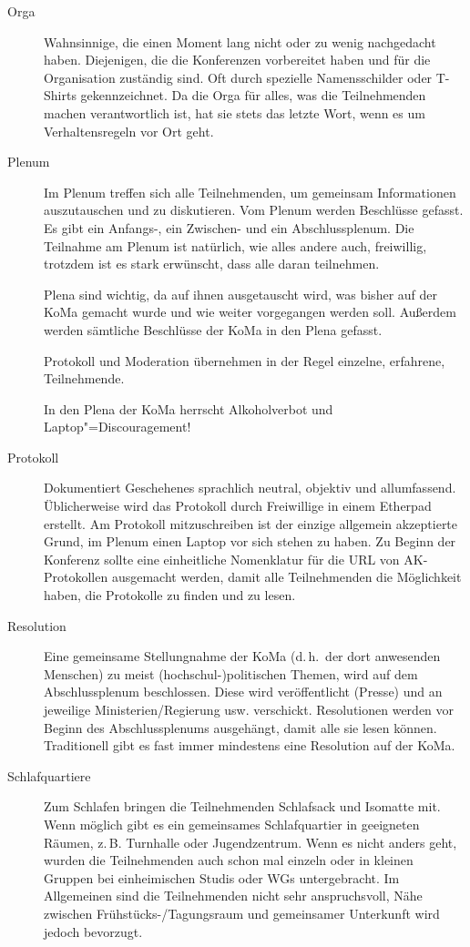 \begin{description}
\item[Orga]
    Wahnsinnige, die einen Moment lang nicht oder zu wenig nachgedacht haben. Diejenigen, die die Konferenzen vorbereitet haben und für die Organisation zuständig sind. Oft durch spezielle Namensschilder oder T-Shirts gekennzeichnet.
    Da die Orga für alles, was die Teilnehmenden machen verantwortlich ist, hat sie stets das letzte Wort, wenn es um Verhaltensregeln vor Ort geht.

\item[Plenum]
    Im Plenum treffen sich alle Teilnehmenden, um gemeinsam Informationen auszutauschen und zu diskutieren. Vom Plenum werden Beschlüsse gefasst. Es gibt ein Anfangs-, ein Zwischen- und ein Abschlussplenum. Die Teilnahme am Plenum ist natürlich, wie alles andere auch, freiwillig, trotzdem ist es stark erwünscht, dass alle daran teilnehmen.
    
    Plena sind wichtig, da auf ihnen ausgetauscht wird, was bisher auf der KoMa gemacht wurde und wie weiter vorgegangen werden soll. Außerdem werden sämtliche Beschlüsse der KoMa in den Plena gefasst.
    
	Protokoll und Moderation übernehmen in der Regel einzelne, erfahrene, Teilnehmende.
    
    In den Plena der KoMa herrscht Alkoholverbot und Laptop"=Discouragement!

\item[Protokoll]
    Dokumentiert Geschehenes sprachlich neutral, objektiv und allumfassend. Üblicherweise wird das Protokoll durch Freiwillige in einem Etherpad erstellt. Am Protokoll mitzuschreiben ist der einzige allgemein akzeptierte Grund, im Plenum einen Laptop vor sich stehen zu haben.
	Zu Beginn der Konferenz sollte eine einheitliche Nomenklatur für die URL von AK-Protokollen ausgemacht werden, damit alle Teilnehmenden die Möglichkeit haben, die Protokolle zu finden und zu lesen.

\item[Resolution]
    Eine gemeinsame Stellungnahme der KoMa (d.\,h.\ der dort anwesenden Menschen) zu meist (hochschul-)politischen Themen, wird auf dem Abschlussplenum beschlossen.
    Diese wird veröffentlicht (Presse) und an jeweilige Ministerien/Regierung usw. verschickt.
    Resolutionen werden vor Beginn des Abschlussplenums ausgehängt, damit alle sie lesen können. Traditionell gibt es fast immer mindestens eine Resolution auf der KoMa.

\item[Schlafquartiere]
    Zum Schlafen bringen die Teilnehmenden Schlafsack und Isomatte mit. Wenn möglich gibt es ein gemeinsames Schlafquartier in geeigneten Räumen, z.\,B. Turnhalle oder Jugendzentrum. Wenn es nicht anders geht, wurden die Teilnehmenden auch schon mal einzeln oder in kleinen Gruppen bei einheimischen Studis oder WGs untergebracht. 
    Im Allgemeinen sind die Teilnehmenden nicht sehr anspruchsvoll, Nähe zwischen Frühstücks-/Tagungsraum und gemeinsamer Unterkunft wird jedoch bevorzugt.


\end{description}
